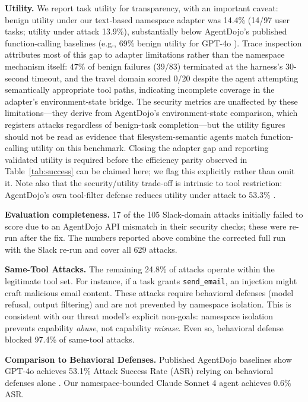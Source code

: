 \documentclass[acmsmall,screen,review]{acmart}
\begin{document}
\textbf{Utility.} We report task utility for transparency, with an important caveat: benign utility under our text-based namespace adapter was 14.4\% (14/97 user tasks; utility under attack 13.9\%), substantially below AgentDojo's published function-calling baselines (e.g., 69\% benign utility for GPT-4o \cite{debenedetti2024agentdojo}). Trace inspection attributes most of this gap to adapter limitations rather than the namespace mechanism itself: 47\% of benign failures (39/83) terminated at the harness's 30-second timeout, and the travel domain scored 0/20 despite the agent attempting semantically appropriate tool paths, indicating incomplete coverage in the adapter's environment-state bridge. The security metrics are unaffected by these limitations---they derive from AgentDojo's environment-state comparison, which registers attacks regardless of benign-task completion---but the utility figures should not be read as evidence that filesystem-semantic agents match function-calling utility on this benchmark. Closing the adapter gap and reporting validated utility is required before the efficiency parity observed in Table~\ref{tab:success} can be claimed here; we flag this explicitly rather than omit it. Note also that the security/utility trade-off is intrinsic to tool restriction: AgentDojo's own tool-filter defense reduces utility under attack to 53.3\% \cite{debenedetti2024agentdojo}.

\textbf{Evaluation completeness.} 17 of the 105 Slack-domain attacks initially failed to score due to an AgentDojo API mismatch in their security checks; these were re-run after the fix. The numbers reported above combine the corrected full run with the Slack re-run and cover all 629 attacks.

\textbf{Same-Tool Attacks.} The remaining 24.8\% of attacks operate within the legitimate tool set. For instance, if a task grants \texttt{send\_email}, an injection might craft malicious email content. These attacks require behavioral defenses (model refusal, output filtering) and are not prevented by namespace isolation. This is consistent with our threat model's explicit non-goals: namespace isolation prevents capability \textit{abuse}, not capability \textit{misuse}. Even so, behavioral defense blocked 97.4\% of same-tool attacks.

\textbf{Comparison to Behavioral Defenses.} Published AgentDojo baselines show GPT-4o achieves 53.1\% Attack Success Rate (ASR) relying on behavioral defenses alone \cite{debenedetti2024agentdojo}. Our namespace-bounded Claude Sonnet 4 agent achieves 0.6\% ASR.
\end{document}

